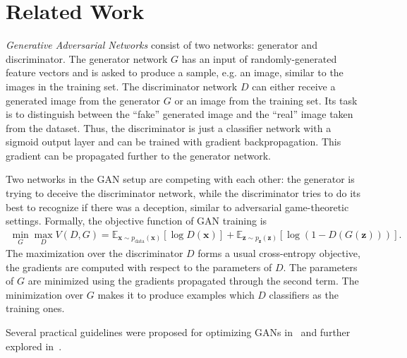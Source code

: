 \documentclass{article}
\begin{document}
\section{Related Work}
\label{sec:relatedwork}
\emph{Generative Adversarial Networks} consist of two networks: generator and discriminator. 
    The generator network $G$ has an
    input of randomly-generated feature vectors and is asked to produce a sample, e.g. an image, 
    similar to the images in the training set. The discriminator network $D$
    can either receive a generated image from the generator $G$ or an image
    from the training set. Its task is to distinguish
    between the ``fake'' generated image and the ``real'' image taken from the dataset. Thus,
    the discriminator is just a classifier network with a sigmoid output layer
    and can be trained with gradient backpropagation. This gradient can be propagated further
    to the generator network.

    Two networks in the GAN setup are competing with each other: the 
    generator is trying to deceive the discriminator network, while the discriminator tries
    to do its best to recognize if there was a deception, similar to adversarial game-theoretic settings.    
    Formally, the objective function of GAN training is
    \begin{align*}
        \min_G \max_D V(D, G) = \mathbb{E}_{\bm{x} \sim p_{\text{data}}(\bm{x})}[\log D(\bm{x})] + 
            \mathbb{E}_{\bm{z} \sim p_{\bm{z}}(\bm{z})}[\log (1 - D(G(\bm{z})))].
    \end{align*}
    The maximization over the discriminator $D$ forms a usual cross-entropy objective, the gradients are
    computed with respect to the parameters of $D$. The parameters of $G$ are minimized using the gradients
    propagated through the second term. The minimization over $G$ makes it to produce examples which $D$
    classifiers as the training ones.

    Several practical guidelines were proposed for optimizing GANs in~\cite{radford2015unsupervised} and 
    further explored in~\cite{salimans2016improved}.
    
\end{document}
